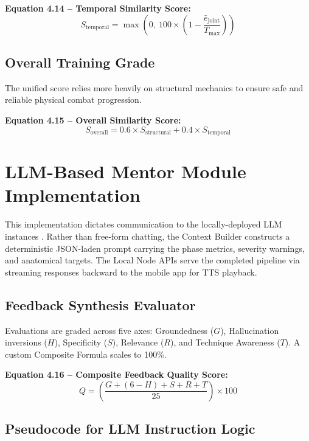 \begin{sloppypar}
\textbf{Equation 4.14 -- Temporal Similarity Score:}
\begin{equation}
S_{\text{temporal}} = \max\left(0,\ 100 \times \left(1 - \frac{\bar{e}_{\text{joint}}}{T_{\text{max}}}\right)\right)
\tag{4.14}
\end{equation}

\subsection{Overall Training Grade}
The unified score relies more heavily on structural mechanics to ensure safe and reliable physical combat progression.

\textbf{Equation 4.15 -- Overall Similarity Score:}
\begin{equation}
S_{\text{overall}} = 0.6 \times S_{\text{structural}} + 0.4 \times S_{\text{temporal}}
\tag{4.15}
\end{equation}


\section{LLM-Based Mentor Module Implementation}

This implementation dictates communication to the locally-deployed LLM instances \cite{llama3_touvron}. Rather than free-form chatting, the Context Builder constructs a deterministic JSON-laden prompt carrying the phase metrics, severity warnings, and anatomical targets. The Local Node APIs serve the completed pipeline via streaming responses backward to the mobile app for TTS playback.

\subsection{Feedback Synthesis Evaluator}

Evaluations are graded across five axes: Groundedness ($G$), Hallucination inversions ($H$), Specificity ($S$), Relevance ($R$), and Technique Awareness ($T$). A custom Composite Formula \cite{llama3_touvron} scales to 100\%.

\textbf{Equation 4.16 -- Composite Feedback Quality Score:}
\begin{equation}
Q = \left( \frac{G + (6 - H) + S + R + T}{25} \right) \times 100
\tag{4.16}
\end{equation}


\subsection{Pseudocode for LLM Instruction Logic}


\end{sloppypar}
